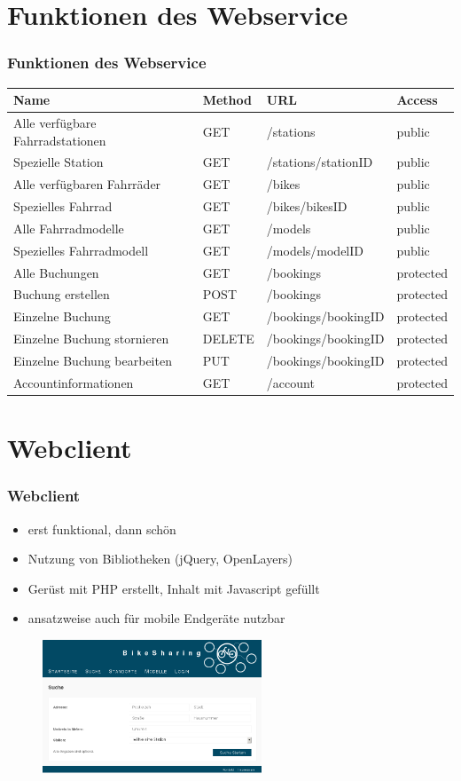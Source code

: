 \section{Funktionen des Webservice}
\begin{frame}
	\frametitle*{Funktionen des Webservice}
		\begin{tabularx}{\columnwidth}{|X|p{1cm}|p{2.5cm}|p{1.5cm}|}
		\hline
		Name & Method & URL & Access \\
		\hline
		\hline
		Alle verfügbare Fahrradstationen & GET & /stations & public \\
		\hline
		Spezielle Station & GET & /stations/stationID & public \\
		\hline
		Alle verfügbaren Fahrräder & GET & /bikes & public \\
		\hline
		Spezielles Fahrrad & GET & /bikes/bikesID & public \\
		\hline
		Alle Fahrradmodelle & GET & /models & public \\
		\hline
		Spezielles Fahrradmodell & GET & /models/modelID & public \\
		\hline
		Alle Buchungen & GET & /bookings & protected \\
		\hline
		Buchung erstellen & POST & /bookings & protected \\
		\hline
		Einzelne Buchung & GET & /bookings/bookingID & protected \\
		\hline
		Einzelne Buchung stornieren & DELETE & /bookings/bookingID & protected \\
		\hline
		Einzelne Buchung bearbeiten & PUT & /bookings/bookingID & protected \\
		\hline
		Accountinformationen & GET & /account & protected \\
		\hline
	\end{tabularx}
\end{frame}

\section{Webclient}
\begin{frame}
	\frametitle*{Webclient}
	\begin{itemize}
		\item erst funktional, dann schön
		\item Nutzung von Bibliotheken (jQuery, OpenLayers)
		\item Gerüst mit PHP erstellt, Inhalt mit Javascript gefüllt
		\item ansatzweise auch für mobile Endgeräte nutzbar
	\end{itemize}
	\begin{figure}
		\centering
		\includegraphics[height=40mm]{pics/bikesharing_search.png}
	\end{figure}
\end{frame}

